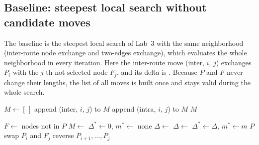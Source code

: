 \documentclass[11pt,a4paper]{article}
\begin{document}
\subsection*{Baseline: steepest local search without candidate moves}
The baseline is the steepest local search of Lab~3 with the same neighborhood (inter-route node
exchange and two-edges exchange), which evaluates the whole neighborhood in every iteration. Here
the inter-route move (inter, $i$, $j$) exchanges $P_i$ with the $j$-th not selected node $F_j$, and
its delta is . Because $P$ and $F$ never change
their lengths, the list of all moves is built once and stays valid during the whole search.

\begin{algorithm}[H]
\caption{List of all moves (baseline)}
\begin{algorithmic}[1]
  \State $M \gets [\,]$
      \State append (inter, $i$, $j$) to $M$
    \EndFor
  \EndFor
       
        \State append (intra, $i$, $j$) to $M$
      \EndIf
    \EndFor
  \EndFor
  \State \Return $M$
\EndFunction
\end{algorithmic}
\end{algorithm}

\begin{algorithm}[H]
\caption{Steepest local search (baseline)}
\begin{algorithmic}[1]
  \State $F \gets$ nodes not in $P$
  \State $M \gets$ 
  \Loop
    \State $\Delta^* \gets 0$, $m^* \gets$ none
        \State $\Delta \gets$ 
      \Else
        \State $\Delta \gets$ 
      \EndIf
      \If{$\Delta < \Delta^*$}
        \State $\Delta^* \gets \Delta$, $m^* \gets m$
      \EndIf
    \EndFor
     
      \State \Return $P$
    \EndIf
      \State swap $P_i$ and $F_j$
    \Else {}
      \State reverse $P_{i+1}, \dots, P_j$
    \EndIf
  \EndLoop
\EndFunction
\end{algorithmic}
\end{algorithm}
\end{document}
